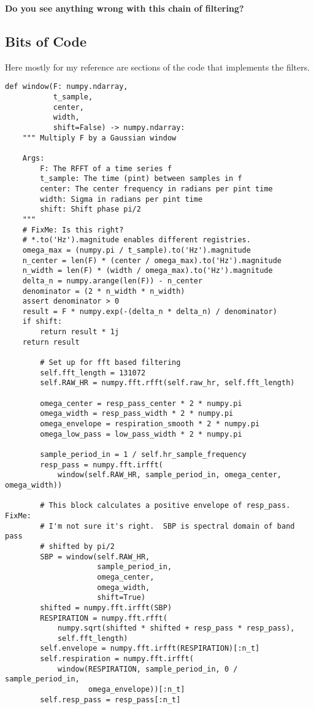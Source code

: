 \documentclass[twocolumn]{article}
\begin{document}
\textbf{Do you see anything wrong with this chain of filtering?}

\subsection{Bits of Code}
\label{sec:code}

Here mostly for my reference are sections of the code that implements
the filters.
\begin{verbatim}
def window(F: numpy.ndarray,
           t_sample,
           center,
           width,
           shift=False) -> numpy.ndarray:
    """ Multiply F by a Gaussian window

    Args:
        F: The RFFT of a time series f
        t_sample: The time (pint) between samples in f
        center: The center frequency in radians per pint time
        width: Sigma in radians per pint time
        shift: Shift phase pi/2
    """
    # FixMe: Is this right?
    # *.to('Hz').magnitude enables different registries.
    omega_max = (numpy.pi / t_sample).to('Hz').magnitude
    n_center = len(F) * (center / omega_max).to('Hz').magnitude
    n_width = len(F) * (width / omega_max).to('Hz').magnitude
    delta_n = numpy.arange(len(F)) - n_center
    denominator = (2 * n_width * n_width)
    assert denominator > 0
    result = F * numpy.exp(-(delta_n * delta_n) / denominator)
    if shift:
        return result * 1j
    return result

        # Set up for fft based filtering
        self.fft_length = 131072
        self.RAW_HR = numpy.fft.rfft(self.raw_hr, self.fft_length)

        omega_center = resp_pass_center * 2 * numpy.pi
        omega_width = resp_pass_width * 2 * numpy.pi
        omega_envelope = respiration_smooth * 2 * numpy.pi
        omega_low_pass = low_pass_width * 2 * numpy.pi

        sample_period_in = 1 / self.hr_sample_frequency
        resp_pass = numpy.fft.irfft(
            window(self.RAW_HR, sample_period_in, omega_center, omega_width))

        # This block calculates a positive envelope of resp_pass.  FixMe:
        # I'm not sure it's right.  SBP is spectral domain of band pass
        # shifted by pi/2
        SBP = window(self.RAW_HR,
                     sample_period_in,
                     omega_center,
                     omega_width,
                     shift=True)
        shifted = numpy.fft.irfft(SBP)
        RESPIRATION = numpy.fft.rfft(
            numpy.sqrt(shifted * shifted + resp_pass * resp_pass),
            self.fft_length)
        self.envelope = numpy.fft.irfft(RESPIRATION)[:n_t]
        self.respiration = numpy.fft.irfft(
            window(RESPIRATION, sample_period_in, 0 / sample_period_in,
                   omega_envelope))[:n_t]
        self.resp_pass = resp_pass[:n_t]

\end{verbatim}
\end{document}
